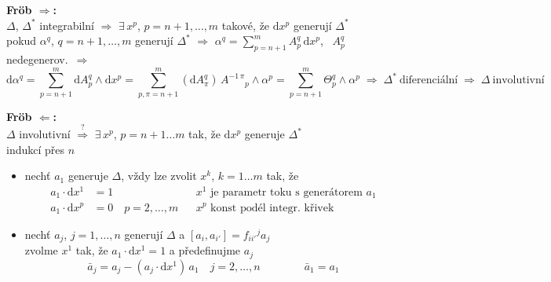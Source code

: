 \textbf{Fröb $\Rightarrow$:} \\
$\Delta$, $\Delta^*$ integrabilní $\Rightarrow$ $\exists\,x^{p}$, $p = n+1,\dots,m$ takové, že $\mathrm{d}x^{p}$ generují $\Delta^*$ \\
pokud $\alpha^{q}$, $q = n+1,\dots,m$ generují $\Delta^*$ $\Rightarrow$ $\alpha^{q} = \sum_{p=n+1}^{m}A^{q}_{p}\,\mathrm{d}x^{p}$, \ $A^{q}_{p}$ nedegenerov.\ $\Rightarrow$
\[
  \mathrm{d}\alpha^{q} = \sum_{p=n+1}^{m}\mathrm{d}A^{q}_{p}\wedge\mathrm{d}x^{p}
  = \sum_{p,\pi=n+1}^{m}(\mathrm{d}A^{q}_{\pi})\,A^{-1\,\pi}{}_{p}\wedge\alpha^{p}
  = \sum_{p=n+1}^{m}\Theta^{q}_{p}\wedge\alpha^{p}
  \;\Rightarrow\; \Delta^*\ \text{diferenciální} \;\Rightarrow\; \Delta\ \text{involutivní}
\]

\textbf{Fröb $\Leftarrow$:} \\
$\Delta$ involutivní $\overset{?}{\Rightarrow}$ $\exists\,x^{p}$, $p = n+1\dots m$ tak, že $\mathrm{d}x^{p}$ generuje $\Delta^*$ \\
indukcí přes $n$
\begin{itemize}[nosep,leftmargin=1.2cm]
  \item[$n = 1$:] nechť $a_1$ generuje $\Delta$, vždy lze zvolit $x^{k}$, $k = 1\dots m$ tak, že
  \begin{align*}
    a_1\cdot\mathrm{d}x^{1} &= 1 && x^{1} \text{ je parametr toku s generátorem } a_1 \\
    a_1\cdot\mathrm{d}x^{p} &= 0 \quad p = 2,\dots,m && x^{p} \text{ konst podél integr.\ křivek}
  \end{align*}
  \item[$n-1\to n$:] nechť $a_j$, $j = 1,\dots,n$ generují $\Delta$ a $[a_i,a_{i'}] = f_{ii'}{}^{j}a_j$ \\
  zvolme $x^{1}$ tak, že $a_1\cdot\mathrm{d}x^{1} = 1$ a předefinujme $a_j$
  \[
    \bar a_j = a_j - (a_j\cdot\mathrm{d}x^{1})\,a_1 \quad j = 2,\dots,n \qquad\qquad \bar a_1 = a_1
  \]
\end{itemize}

